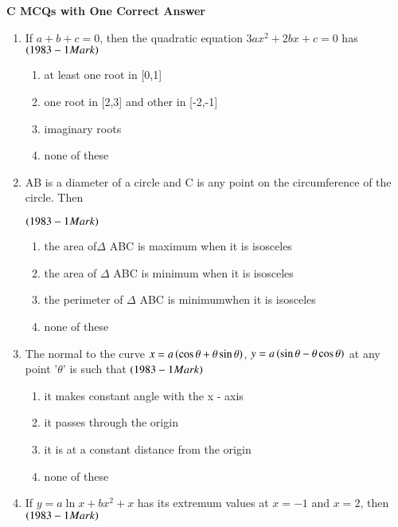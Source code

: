 \documentclass[journal,12pt,twocolumn]{IEEEtran}
\theoremstyle{remark}
\begin{document}
\textbf{C MCQs with One Correct Answer}\\

\begin{enumerate}

        \item If $a+b+c = 0$, then the quadratic equation 
$3ax^2 + 2bx + c = 0$ has\hfill$\left(1983 - 1 Mark\right)$

\begin{enumerate}[label=\alph*.]
	\item at least one root in [0,1]
	\item one root in [2,3] and other in [-2,-1]
        \item imaginary roots
	\item none of these\\
\end{enumerate}

         \item AB is a diameter of a circle and C is any point on the
circumference of the circle. Then 

		\hfill$\left(1983 - 1 Mark\right)$

\begin{enumerate}[label=\alph*.]
	\item the area of$\Delta$ ABC is maximum when it is isosceles
	\item the area of $\Delta$ ABC is minimum when it is isosceles
	\item the perimeter of $\Delta$ ABC is minimumwhen it is isosceles
	\item none of these\\
\end{enumerate}

         \item The normal to the curve 
$x = a\left(\cos \theta + \theta\sin \theta\right)$,
$y = a\left(\sin \theta - \theta\cos \theta\right)$ at any point '$\theta$' 
is such that \hfill$\left(1983 - 1 Mark\right)$

\begin{enumerate}[label=\alph*.]
	\item it makes  constant angle with the x - axis
	\item it passes through the origin
	\item it is at a constant distance from the origin
	\item none of these\\
\end{enumerate}

        \item If $y=a\ln x + bx^2 +x$ has its extremum values at 
$x = -1$ and $x = 2$, then\hfill$\left(1983 - 1 Mark\right)$


\end{enumerate}
\end{document}
